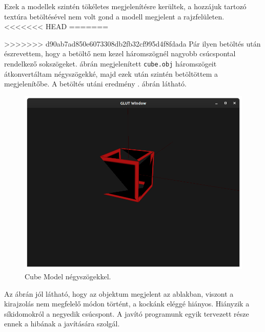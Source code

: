 Ezek a modellek szintén tökéletes megjelenítésre kerültek, a hozzájuk tartozó textúra betöltésével nem volt gond a modell megjelent a rajzfelületen.
<<<<<<< HEAD
\newpage
=======

>>>>>>> d90ab7ad850e6073308db2fb32cf995d4f8fdada
Pár ilyen betöltés után észrevettem, hogy a betöltő nem kezel háromszögnél nagyobb csúcspontal rendelkező sokszögeket.  ábrán megjelenített \texttt{cube.obj} háromszögeit átkonvertáltam négyszögekké, majd ezek után szintén betöltöttem a megjelenítőbe. A betöltés utáni eredmény . ábrán látható.

\begin{figure}[h]
\centering
\includegraphics[width=\textwidth]{images/Model_quads.png}
\caption{Cube Model négyszögekkel.}
\label{fig:model2}
\end{figure}

Az ábrán jól látható, hogy az objektum megjelent az ablakban, viszont a kirajzolás nem megfelelő módon történt, a kockánk eléggé hiányos. Hiányzik a síkidomokról a negyedik csúcspont. A javító programunk egyik tervezett része ennek a hibának a javítására szolgál.
